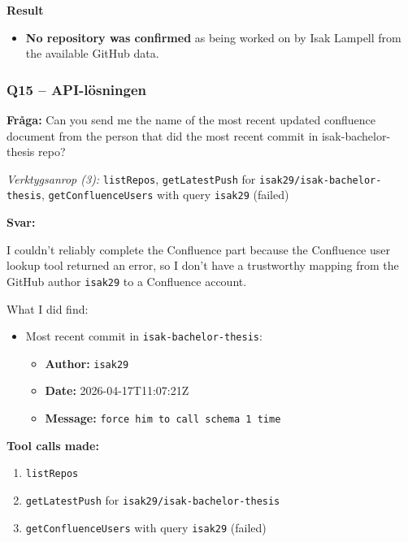 \textbf{Result}
\begin{itemize}
    \item \textbf{No repository was confirmed} as being worked on by Isak Lampell from the available GitHub data.
\end{itemize}

\clearpage
\subsubsection*{Q15 -- API-lösningen}\label{fig:api_q15}

\textbf{Fråga:} Can you send me the name of the most recent updated confluence document from the person that did the most recent commit in isak-bachelor-thesis repo?

\medskip
\textit{Verktygsanrop (3):} \texttt{listRepos}, \texttt{getLatestPush} for \texttt{isak29/isak-bachelor-thesis}, \texttt{getConfluenceUsers} with query \texttt{isak29} (failed)

\medskip
\textbf{Svar:}

I couldn't reliably complete the Confluence part because the Confluence user lookup tool returned an error, so I don't have a trustworthy mapping from the GitHub author \texttt{isak29} to a Confluence account.

What I did find:
\begin{itemize}
    \item Most recent commit in \texttt{isak-bachelor-thesis}:
    \begin{itemize}
        \item \textbf{Author:} \texttt{isak29}
        \item \textbf{Date:} 2026-04-17T11:07:21Z
        \item \textbf{Message:} \texttt{force him to call schema 1 time}
    \end{itemize}
\end{itemize}

\textbf{Tool calls made:}
\begin{enumerate}
    \item \texttt{listRepos}
    \item \texttt{getLatestPush} for \texttt{isak29/isak-bachelor-thesis}
    \item \texttt{getConfluenceUsers} with query \texttt{isak29} (failed)
\end{enumerate}
